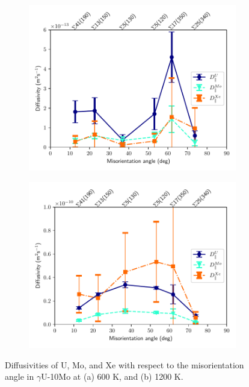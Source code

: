 \documentclass{elsarticle}
\begin{document}
\begin{figure}[!ht]
    \centering
    \begin{subfigure}{0.49\textwidth}
        \centering
        \caption{}
        \includegraphics[width=\textwidth]{DvsTilt_600K.pdf}
    \end{subfigure}
    \begin{subfigure}{0.49\textwidth}
        \centering
        \caption{}
        \includegraphics[width=\textwidth]{DvsTilt_1200K.pdf}
    \end{subfigure}
\caption{Diffusivities of U, Mo, and Xe with respect to the misorientation angle in $\gamma$U-10Mo at (a) 600 K, and (b) 1200 K.}
\label{fig:dvstilt}
\end{figure}
\end{document}
